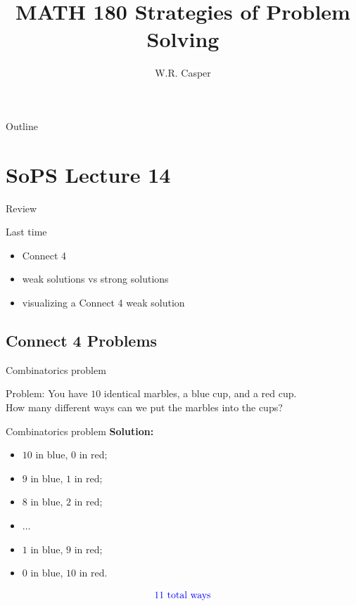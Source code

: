 \documentclass{beamer}
\title{MATH 180 Strategies of Problem Solving}
\subtitle
{} %
\author[W.R. Casper] %
{W.R. Casper}
\institute[California State University Fullerton] %
{
  Department of Mathematics\\
  California State University Fullerton}
\begin{document}
\begin{frame}
  \titlepage
\end{frame}

\begin{frame}{Outline}
  \tableofcontents
\end{frame}



\section{SoPS Lecture 14}

\begin{frame}{Review}
  \begin{block}{Last time}
    \begin{itemize}
\pause
      \item Connect 4
\pause
      \item weak solutions vs strong solutions
\pause
      \item visualizing a Connect 4 weak solution
    \end{itemize}
  \end{block}
\end{frame}

\subsection{Connect 4 Problems}

\begin{frame}{Combinatorics problem}
\pause
  \begin{block}{Problem:}
\pause
    You have $10$ identical marbles, a blue cup, and a red cup.\\
\pause
    How many different ways can we put the marbles into the cups?
  \end{block}
\end{frame}

\begin{frame}{Combinatorics problem}
\pause
\textbf{Solution:}\\
  \begin{itemize}
\pause
    \item $10$ in blue, $0$ in red;
\pause
    \item $9$ in blue, $1$ in red;
\pause
    \item $8$ in blue, $2$ in red;
\pause
    \item $\dots$
\pause
    \item $1$ in blue, $9$ in red;
\pause
    \item $0$ in blue, $10$ in red.
  \end{itemize}
\pause
$$\text{{\color{blue}11 total ways}}$$
\end{frame}
\end{document}
